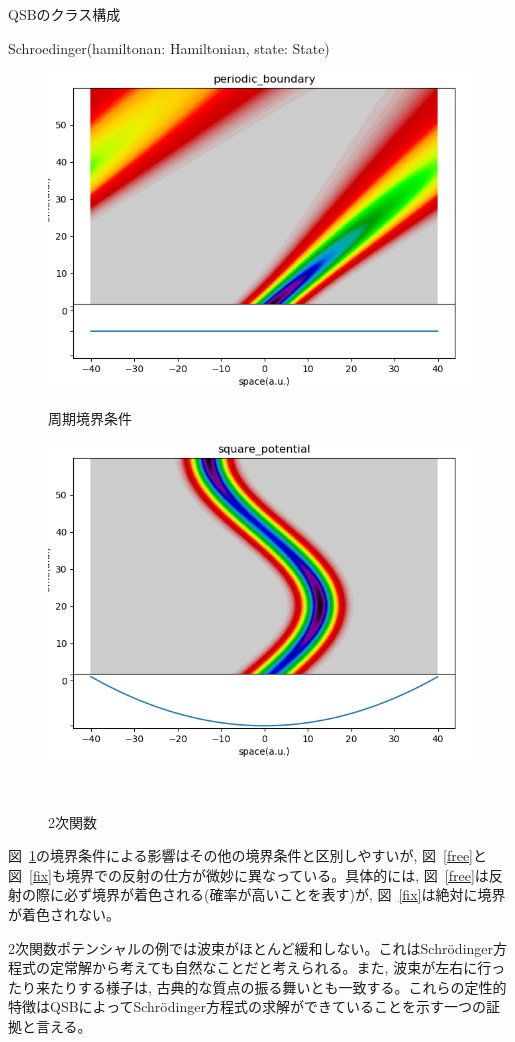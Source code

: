 \documentclass[a4paper, lualatex]{bxjsarticle}
\newcommand{\fref}[1]{図~\ref{#1}}
\begin{document}
\begin{section}{QSBのクラス構成\label{AppQ}}
\begin{subsection}{Schroedinger(hamiltonan: Hamiltonian, state: State)}
\begin{figure}[h]
\begin{minipage}{0.5\hsize}
                \includegraphics[width=0.9\hsize]{periodic_boundary.png}
                \caption{周期境界条件}
                \label{period}
            \end{minipage}
            \begin{minipage}{0.5\hsize}
                \centering
                \includegraphics[width=0.9\hsize]{square_potential.png}
                \caption{2次関数}
            \end{minipage}\\
        \end{figure}
        \par \fref{period}の境界条件による影響はその他の境界条件と区別しやすいが, \fref{free}と\fref{fix}も境界での反射の仕方が微妙に異なっている。具体的には, \fref{free}は反射の際に必ず境界が着色される(確率が高いことを表す)が, \fref{fix}は絶対に境界が着色されない。
        \par 2次関数ポテンシャルの例では波束がほとんど緩和しない。これはSchrödinger方程式の定常解から考えても自然なことだと考えられる。また, 波束が左右に行ったり来たりする様子は, 古典的な質点の振る舞いとも一致する。これらの定性的特徴はQSBによってSchrödinger方程式の求解ができていることを示す一つの証拠と言える。
    \end{subsection}

\end{section}
\end{document}

